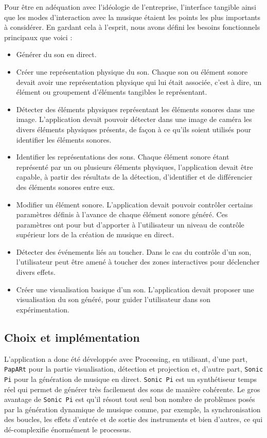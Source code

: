 Pour être en adéquation avec l'idéologie de l'entreprise, l'interface tangible ainsi que les modes d'interaction avec la musique étaient les points les plus importants à considérer. En gardant cela à l'esprit, nous avons défini les besoins fonctionnels principaux que voici :
\begin{itemize}
\item Générer du son en direct.
\item Créer une représentation physique du son. Chaque son ou élément sonore devait avoir une représentation physique qui lui était associée, c'est à dire, un élément ou groupement d'éléments tangibles le représentant.
\item Détecter des éléments physiques représentant les éléments sonores dans une image. L'application devait pouvoir détecter dans une image de caméra les divers éléments physiques présents, de façon à ce qu'ils soient utilisés pour identifier les éléments sonores.
\item Identifier les représentations des sons. Chaque élément sonore étant représenté par un ou plusieurs éléments physiques, l'application devait être capable, à partir des résultats de la détection, d'identifier et de différencier des éléments sonores entre eux. 
\item Modifier un élément sonore. L'application devait pouvoir contrôler certains paramètres définis à l'avance de chaque élément sonore généré. Ces paramètres ont pour but d'apporter à l'utilisateur un niveau de contrôle supérieur lors de la création de musique en direct.
\item Détecter des événements liés au toucher. Dans le cas du contrôle d'un son, l'utilisateur peut être amené à toucher des zones interactives pour déclencher divers effets.
\item Créer une visualisation basique d'un son. L'application devait proposer une visualisation du son généré, pour guider l'utilisateur dans son expérimentation.
\end{itemize}

\subsection{Choix et implémentation}
\label{subsec:reartable:impl}
L'application a donc été développée avec Processing, en utilisant, d'une part, \texttt{PapARt} pour la partie visualisation, détection et projection et, d'autre part, \texttt{Sonic Pi}\cite{sonicpi} pour la génération de musique en direct.
\texttt{Sonic Pi} est un synthétiseur temps réel qui permet de générer très facilement des sons de manière cohérente. Le gros avantage de \texttt{Sonic Pi} est qu'il résout tout seul bon nombre de problèmes posés par la génération dynamique de musique comme, par exemple, la synchronisation des boucles, les effets d'entrée et de sortie des instruments et bien d'autres, ce qui dé-complexifie énormément le processus.

